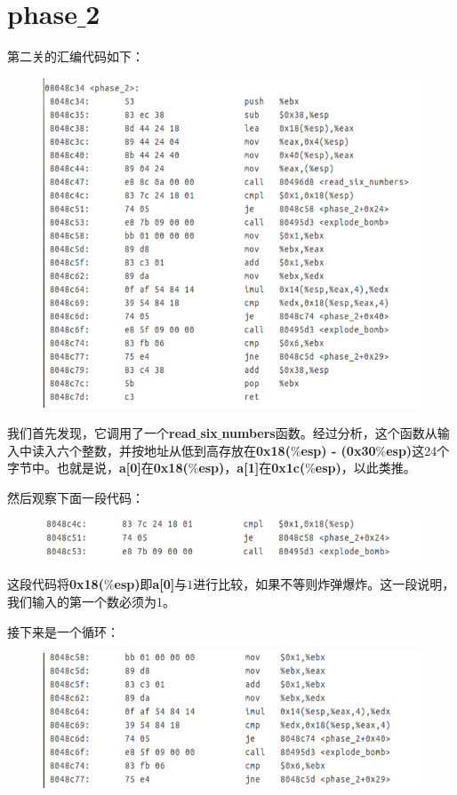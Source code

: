 \section{phase$\_$2}
	第二关的汇编代码如下：
	\begin{figure}[h]
		\centering
			\includegraphics[scale=0.77]{images/phase_2.png}
	\end{figure}
	
	我们首先发现，它调用了一个\textbf{read$\_$six$\_$numbers}函数。经过分析，这个函数从输入中读入六个整数，并按地址从低到高存放在\textbf{0x18($\%$esp) - (0x30$\%$esp)}这24个字节中。也就是说，\textbf{a[0]}在\textbf{0x18($\%$esp)}，\textbf{a[1]}在\textbf{0x1c($\%$esp)}，以此类推。
	
	然后观察下面一段代码：
	
	\begin{figure}[h]
		\centering
			\includegraphics[scale=0.77]{images/phase_2_part_0.png}
	\end{figure}
	
	这段代码将\textbf{0x18($\%$esp)}即\textbf{a[0]}与$1$进行比较，如果不等则炸弹爆炸。这一段说明，我们输入的第一个数必须为1。
	
	接下来是一个循环：

	\begin{figure}[h]
		\centering
			\includegraphics[scale=0.77]{images/phase_2_part_1.png}
	\end{figure}
		
